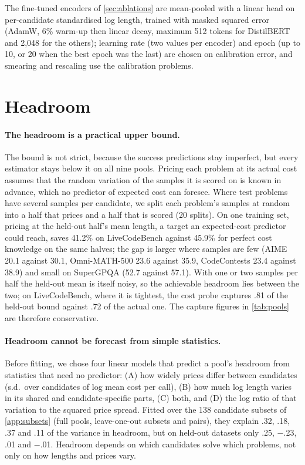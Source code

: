 \documentclass[10pt]{article}
\begin{document}
The fine-tuned encoders of \cref{sec:ablations} are mean-pooled with a linear head on per-candidate standardised log length, trained with masked squared error (AdamW, 6\% warm-up then linear decay, maximum 512 tokens for DistilBERT and 2,048 for the others); learning rate (two values per encoder) and epoch (up to 10, or 20 when the best epoch was the last) are chosen on calibration error, and smearing and rescaling use the calibration problems.

\FloatBarrier
\section{Headroom}\label{app:headroom}
\paragraph{The headroom is a practical upper bound.}
The bound is not strict, because the success predictions stay imperfect, but every estimator stays below it on all nine pools. Pricing each problem at its actual cost assumes that the random variation of the samples it is scored on is known in advance, which no predictor of expected cost can foresee. Where test problems have several samples per candidate, we split each problem's samples at random into a half that prices and a half that is scored (20 splits). On one training set, pricing at the held-out half's mean length, a target an expected-cost predictor could reach, saves 41.2\% on LiveCodeBench against 45.9\% for perfect cost knowledge on the same halves; the gap is larger where samples are few (AIME 20.1 against 30.1, Omni-MATH-500 23.6 against 35.9, CodeContests 23.4 against 38.9) and small on SuperGPQA (52.7 against 57.1). With one or two samples per half the held-out mean is itself noisy, so the achievable headroom lies between the two; on LiveCodeBench, where it is tightest, the cost probe captures .81 of the held-out bound against .72 of the actual one. The capture figures in \cref{tab:pools} are therefore conservative.

\paragraph{Headroom cannot be forecast from simple statistics.}
Before fitting, we chose four linear models that predict a pool's headroom from statistics that need no predictor: (A) how widely prices differ between candidates (s.d.\ over candidates of log mean cost per call), (B) how much log length varies in its shared and candidate-specific parts, (C) both, and (D) the log ratio of that variation to the squared price spread. Fitted over the 138 candidate subsets of \cref{app:subsets} (full pools, leave-one-out subsets and pairs), they explain .32, .18, .37 and .11 of the variance in headroom, but on held-out datasets only .25, $-$.23, .01 and $-$.01. Headroom depends on which candidates solve which problems, not only on how lengths and prices vary.
\end{document}
